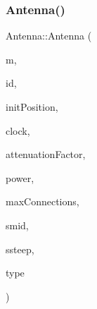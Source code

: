 \subsubsection{\texorpdfstring{Antenna()}{Antenna()}\hspace{0.1cm}{\footnotesize\ttfamily [1/2]}}
{\footnotesize\ttfamily Antenna\+::\+Antenna (\begin{DoxyParamCaption}\item[{const \hyperlink{class_map}{Map} $\ast$}]{m,  }\item[{const unsigned long}]{id,  }\item[{Point $\ast$}]{init\+Position,  }\item[{const \hyperlink{class_clock}{Clock} $\ast$}]{clock,  }\item[{double}]{attenuation\+Factor,  }\item[{double}]{power,  }\item[{unsigned long}]{max\+Connections,  }\item[{double}]{smid,  }\item[{double}]{ssteep,  }\item[{\hyperlink{_antenna_type_8h_a7b678b5cb9dedc607131200119d96b16}{Antenna\+Type}}]{type }\end{DoxyParamCaption})\hspace{0.3cm}{\ttfamily [explicit]}}


